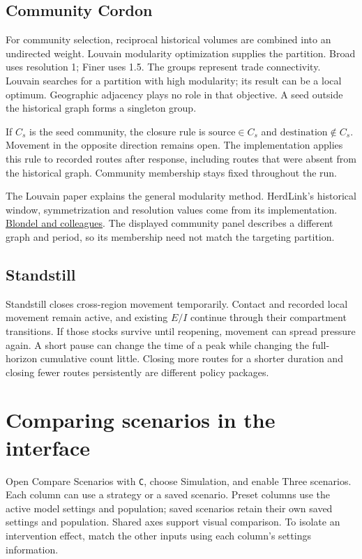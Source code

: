 \documentclass[11pt,a4paper]{article}
\begin{document}
\subsection{Community Cordon}\label{community-cordon}

For community selection, reciprocal historical volumes are combined into
an undirected weight. Louvain modularity optimization supplies the
partition. Broad uses resolution 1; Finer uses 1.5. The groups represent
trade connectivity. Louvain searches for a partition with high
modularity; its result can be a local optimum. Geographic adjacency
plays no role in that objective. A seed outside the historical graph
forms a singleton group.

If \(C_s\) is the seed community, the closure rule is
\(\mathrm{source} \in  C_s\) and \(\mathrm{destination} \notin  C_s\).
Movement in the opposite direction remains open. The implementation
applies this rule to recorded routes after response, including routes
that were absent from the historical graph. Community membership stays
fixed throughout the run.

The Louvain paper explains the general modularity method. HerdLink's
historical window, symmetrization and resolution values come from its
implementation. \href{https://arxiv.org/abs/0803.0476}{Blondel and
colleagues}. The displayed community panel describes a different graph
and period, so its membership need not match the targeting partition.

\subsection{Standstill}\label{standstill}

Standstill closes cross-region movement temporarily. Contact and
recorded local movement remain active, and existing \(E/I\) continue
through their compartment transitions. If those stocks survive until
reopening, movement can spread pressure again. A short pause can change
the time of a peak while changing the full-horizon cumulative count
little. Closing more routes for a shorter duration and closing fewer
routes persistently are different policy packages.

\section{Comparing scenarios in the
interface}\label{comparing-scenarios-in-the-interface}

Open Compare Scenarios with \texttt{C}, choose Simulation, and enable
Three scenarios. Each column can use a strategy or a saved scenario.
Preset columns use the active model settings and population; saved
scenarios retain their own saved settings and population. Shared axes
support visual comparison. To isolate an intervention effect, match the
other inputs using each column's settings information.
\end{document}
